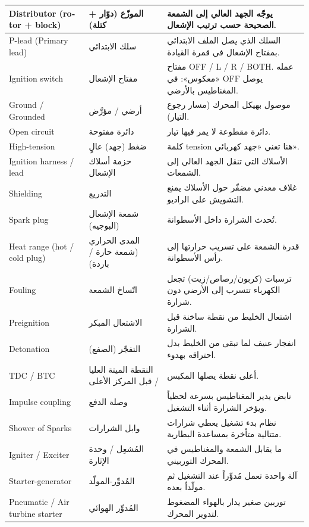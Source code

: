 \documentclass[11pt,a4paper]{article}
\newcommand{\en}[1]{\textenglish{#1}}
\begin{document}
\begin{longtable}{|>{\raggedleft\arraybackslash}p{4.2cm}|>{\raggedleft\arraybackslash}p{3.6cm}|>{\raggedleft\arraybackslash}p{7.2cm}|}
\en{Distributor (rotor + block)} & الموزّع (دوّار + كتلة) & يوجّه الجهد العالي إلى الشمعة الصحيحة حسب ترتيب الإشعال.\\\hline
\en{P-lead (Primary lead)} & سلك الابتدائي & السلك الذي يصل الملف الابتدائي بمفتاح الإشعال في قمرة القيادة.\\\hline
\en{Ignition switch} & مفتاح الإشعال & مفتاح \en{OFF / L / R / BOTH}. عمله «معكوس»: في \en{OFF} يوصل المغناطيس بالأرضي.\\\hline
\en{Ground / Grounded} & أرضي / مؤرَّض & موصول بهيكل المحرك (مسار رجوع التيار).\\\hline
\en{Open circuit} & دائرة مفتوحة & دائرة مقطوعة لا يمر فيها تيار.\\\hline
\en{High-tension} & ضغط (جهد) عالٍ & كلمة \en{tension} هنا تعني «جهد كهربائي».\\\hline
\en{Ignition harness / lead} & حزمة أسلاك الإشعال & الأسلاك التي تنقل الجهد العالي إلى الشمعات.\\\hline
\en{Shielding} & التدريع & غلاف معدني مضفّر حول الأسلاك يمنع التشويش على الراديو.\\\hline
\en{Spark plug} & شمعة الإشعال (البوجيه) & تُحدث الشرارة داخل الأسطوانة.\\\hline
\en{Heat range (hot / cold plug)} & المدى الحراري (شمعة حارة / باردة) & قدرة الشمعة على تسريب حرارتها إلى رأس الأسطوانة.\\\hline
\en{Fouling} & اتّساخ الشمعة & ترسبات (كربون/رصاص/زيت) تجعل الكهرباء تتسرب إلى الأرضي دون شرارة.\\\hline
\en{Preignition} & الاشتعال المبكر & اشتعال الخليط من نقطة ساخنة قبل الشرارة.\\\hline
\en{Detonation} & التفجّر (الصفع) & انفجار عنيف لما تبقى من الخليط بدل احتراقه بهدوء.\\\hline
\en{TDC / BTC} & النقطة الميتة العليا / قبل المركز الأعلى & أعلى نقطة يصلها المكبس.\\\hline
\en{Impulse coupling} & وصلة الدفع & نابض يدير المغناطيس بسرعة لحظياً ويؤخر الشرارة أثناء التشغيل.\\\hline
\en{Shower of Sparks} & وابل الشرارات & نظام بدء تشغيل يعطي شرارات متتالية متأخرة بمساعدة البطارية.\\\hline
\en{Igniter / Exciter} & المُشعِل / وحدة الإثارة & ما يقابل الشمعة والمغناطيس في المحرك التوربيني.\\\hline
\en{Starter-generator} & المُدوِّر-المولّد & آلة واحدة تعمل مُدوِّراً عند التشغيل ثم مولّداً بعده.\\\hline
\en{Pneumatic / Air turbine starter} & المُدوِّر الهوائي & توربين صغير يدار بالهواء المضغوط لتدوير المحرك.\\\hline
\end{longtable}
\end{document}
